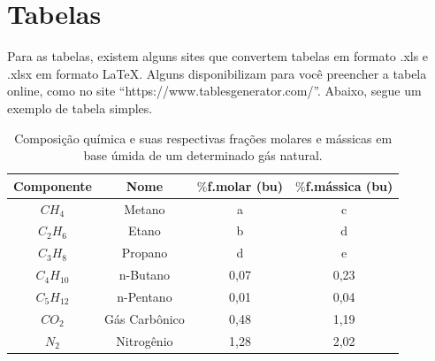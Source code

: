 \section{Tabelas}

Para as tabelas, existem alguns sites que convertem tabelas em formato .xls e .xlsx em formato \LaTeX. Alguns disponibilizam para você preencher a tabela online, como no site ``https://www.tablesgenerator.com/''. Abaixo, segue um exemplo de tabela simples.

\begin{table}[htpb]
\renewcommand{\arraystretch}{1.3}
\caption{Composição química e suas respectivas frações molares e mássicas em base úmida de um determinado gás natural.}
\centering
\begin{tabular}{c c c c}
\hline \hline
Componente & Nome & $\%$f.molar (bu) & $\%$f.mássica (bu)\\
\hline
$CH_4$ & Metano & a & c\\
$C_2H_{6}$ & Etano & b & d\\
$C_3H_{8}$ & Propano & d & e\\
$C_4H_{10}$ & n-Butano & 0,07 & 0,23\\
$C_5H_{12}$ & n-Pentano & 0,01 & 0,04\\
$CO_2$ & Gás Carbônico & 0,48 & 1,19\\
$N_2$  & Nitrogênio & 1,28 & 2,02\\
\hline \hline
\end{tabular}
\label{tab:composicaoquimica}
\\ \vspace{0.1cm}
\end{table}
\vskip 1cm


